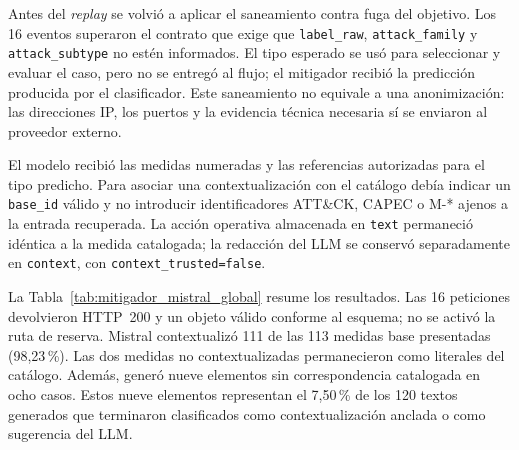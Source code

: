 Antes del \emph{replay} se volvió a aplicar el saneamiento contra fuga del
objetivo. Los 16 eventos superaron el contrato que exige que
\texttt{label\_raw}, \texttt{attack\_family} y
\texttt{attack\_subtype} no estén informados. El tipo esperado se usó para
seleccionar y evaluar el caso, pero no se entregó al flujo; el mitigador recibió
la predicción producida por el clasificador. Este saneamiento no equivale a una
anonimización: las direcciones IP, los puertos y la evidencia técnica necesaria
sí se enviaron al proveedor externo.

El modelo recibió las medidas numeradas y las referencias autorizadas para el
tipo predicho. Para asociar una contextualización con el catálogo debía indicar
un \texttt{base\_id} válido y no introducir identificadores ATT\&CK, CAPEC o
M-* ajenos a la entrada recuperada. La acción operativa almacenada en
\texttt{text} permaneció idéntica a la medida catalogada; la redacción del LLM
se conservó separadamente en \texttt{context}, con
\texttt{context\_trusted=false}.

La Tabla~\ref{tab:mitigador_mistral_global} resume los resultados. Las 16
peticiones devolvieron HTTP~200 y un objeto válido conforme al esquema; no se
activó la ruta de reserva. Mistral contextualizó 111 de las 113 medidas base
presentadas (98,23\,\%). Las dos medidas no contextualizadas permanecieron como
literales del catálogo. Además, generó nueve elementos sin correspondencia
catalogada en ocho casos. Estos nueve elementos representan el 7,50\,\% de los
120 textos generados que terminaron clasificados como contextualización
anclada o como sugerencia del LLM.

